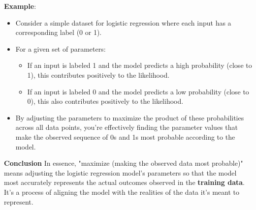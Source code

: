 \documentclass[9pt,dvipsnames]{beamer}
\begin{document}
\begin{frame}{}
	\textbf{Example}:
	
	\begin{itemize}
		\item Consider a simple dataset for logistic regression where each input has a corresponding label (0 or 1).
		\item For a given set of parameters:
		\begin{itemize}
			\item If an input is labeled 1 and the model predicts a high probability (close to 1), this contributes positively to the likelihood.
			\item If an input is labeled 0 and the model predicts a low probability (close to 0), this also contributes positively to the likelihood.
		\end{itemize}
		\item By adjusting the parameters to maximize the product of these probabilities across all data points, you're effectively finding the parameter values that make the observed sequence of 0s and 1s most probable according to the model.
	\end{itemize}
	\textbf{Conclusion}
	In essence, "maximize (making the observed data most probable)" means adjusting the logistic regression model's parameters so that the model most accurately represents the actual outcomes observed in the \textbf{training data}. It's a process of aligning the model with the realities of the data it's meant to represent.
\end{frame}
\end{document}
